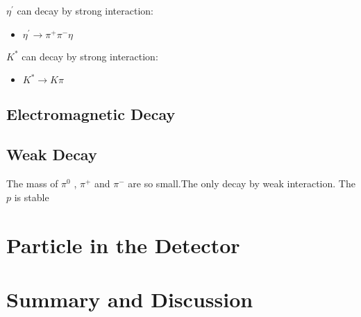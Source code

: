 \documentclass[
10pt, %
a4paper, %
oneside, %
headinclude,footinclude, %
BCOR5mm, %
]{scrartcl}
\begin{document}
$\eta^{'}$ can decay by strong interaction:
\begin{itemize}
\item $\eta^{'}\rightarrow\pi^+\pi^-\eta$
\end{itemize}

$K^{*}$ can decay by strong interaction:
\begin{itemize}
\item $K^{*}\rightarrow K\pi$
\end{itemize}





\subsection{Electromagnetic Decay}




\subsection{Weak Decay}
The mass of $\pi^0$ , $\pi^+$ and $\pi^-$ are so small.The only decay by weak interaction.
The $p$ is stable




\section{Particle in the Detector}



\section{Summary and Discussion}

\end{document}
